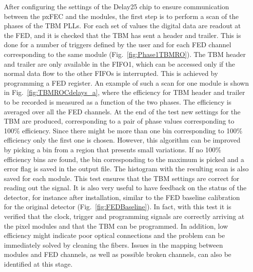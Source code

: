 After configuring the settings of the Delay25 chip to ensure communication between the pxFEC and the modules, the first step is to perform a scan of the phases of the TBM PLLs.
For each set of values the digital data are readout at the FED, and it is checked that the TBM has sent a header and trailer. This is done for a number of triggers defined by the user
and for each FED channel corresponding to the same module (Fig.~\ref{fig:Phase1TBMRO}).
The TBM header and trailer are only available in the FIFO1, which can be accessed only if the normal data flow to the other FIFOs is interrupted. This is achieved by programming a FED register.
An example of such a scan for one module is shown in Fig.~\ref{fig:TBMROCdelays_a}, where the efficiency for TBM header and trailer to be recorded is measured as a function of the two phases.
The efficiency is averaged over all the FED channels.
At the end of the test new settings for the TBM are produced, corresponding to a pair of phase values corresponding to 100\% efficiency. Since there might be more than one bin corresponding to 100\% efficiency only the first one is chosen. However, this algorithm can be improved by picking a bin from a region that presents small variations. If no 100\% efficiency bins are found, the bin corresponding to the maximum is picked and a error flag is saved in the output file. The histogram with the resulting scan is also saved for each module.
This test ensures that the TBM settings are correct for reading out the signal. It is also very useful to have feedback on the status of the detector, for instance after installation, similar to the FED baseline calibration for the original detector (Fig.~\ref{fig:FEDBaseline}). In fact, with this test it is verified that the clock, trigger and programming signals are correctly arriving at the pixel modules and that the TBM can be programmed.
In addition, low efficiency might indicate poor optical connections and the problem can be immediately solved by cleaning the fibers.
Issues in the mapping between modules and FED channels, as well as possible broken channels, can also be identified at this stage.\\

